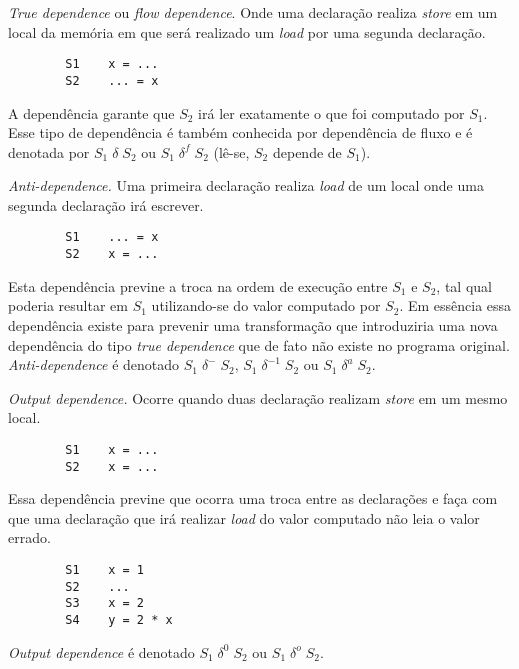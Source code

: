 \begin{alineas}
\item \textit{True dependence} ou \textit{flow dependence}. Onde uma declaração realiza 
        \textit{store} em um local da memória em que será realizado um 
        \textit{load} por uma segunda declaração.
        \begin{verbatim}
        S1    x = ...
        S2    ... = x
        \end{verbatim}
        A dependência garante que $S_2$ irá ler exatamente o que foi computado
        por $S_1$. Esse tipo de dependência é também conhecida por dependência 
        de fluxo e é denotada por  $S_1 \;\delta\; S_2$ ou $S_1 \;\delta^f \; S_2$ 
        (lê-se, $S_2$ depende de $S_1$).

        \item \textit{Anti-dependence.} Uma primeira declaração realiza
        \textit{load} de um local onde uma segunda declaração irá escrever.
        \begin{verbatim}
        S1    ... = x
        S2    x = ...
        \end{verbatim}
        Esta dependência previne a troca na ordem de execução entre $S_1$ 
        e $S_2$, tal qual poderia resultar em $S_1$ utilizando-se do valor 
        computado por $S_2$. 
        Em essência essa dependência existe para prevenir uma transformação que 
        introduziria uma nova dependência do tipo \textit{true dependence} que 
        de fato não existe no programa original. 
        \textit{Anti-dependence} é denotado $S_1 \;\delta^- \;S_2$, 
        $S_1 \;\delta^{-1} \;S_2$ ou $S_1 \;\delta^{a} \;S_2$.

        \item \textit{Output dependence.} Ocorre quando duas declaração 
        realizam \textit{store} em um mesmo local.
        \begin{verbatim}
        S1    x = ...
        S2    x = ...
        \end{verbatim}
        Essa dependência previne que ocorra uma troca entre as declarações e 
        faça com que uma declaração que irá realizar \textit{load} do valor 
        computado não leia o valor errado.
        \begin{verbatim}
        S1    x = 1
        S2    ...
        S3    x = 2 
        S4    y = 2 * x
        \end{verbatim}
        \textit{Output dependence} é denotado  $S_1 \;\delta^0 \;S_2$
        ou $S_1 \;\delta^o \;S_2$.
\end{alineas}

